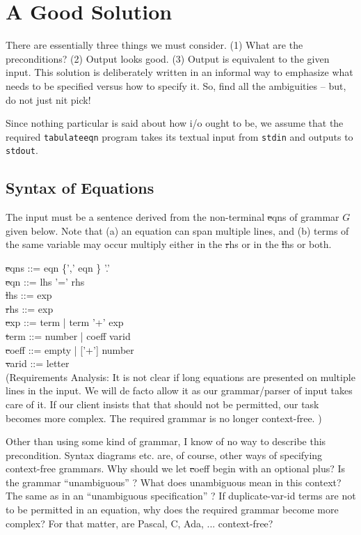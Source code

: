 \documentclass[12pt]{article}
\def\bnf{\st}
\begin{document}
\section{A Good Solution}

{\small There are essentially three things we must consider. (1) What
are the preconditions? (2) Output looks good.  (3) Output is
equivalent to the given input.  This solution is deliberately written
in an informal way to emphasize what needs to be specified versus how
to specify it.  So, find all the ambiguities -- but, do not just nit
pick! }

Since nothing particular is said about how i/o ought to be, we assume
that the required {\tt tabulateeqn} program takes its textual input
from {\tt stdin} and outputs to {\tt stdout}.


\subsection{Syntax of Equations}

The input must be a sentence derived from the non-terminal {\bnf eqns}
of grammar $G$ given below.  Note that (a) an equation can span
multiple lines, and (b) terms of the same variable may occur multiply
either in the {\bnf rhs} or in the {\bnf lhs} or both.

\noindent
{\bnf eqns ::= eqn \{',' eqn \} '.'}\\
{\bnf eqn ::= lhs '=' rhs}\\
{\bnf lhs ::= exp}\\
{\bnf rhs ::= exp}\\
{\bnf exp ::= term | term '+' exp}\\
{\bnf term ::= number | coeff varid}\\
{\bnf coeff ::= empty | ['+'] number}\\
{\bnf varid ::= letter}\\

(Requirements Analysis: It is not clear if long equations are
presented on multiple lines in the input.  We will de facto allow it
as our grammar/parser of input takes care of it.
If our client insists that that should not be permitted, our
task becomes more complex.  The required grammar is no longer
context-free. )

{\small Other than using some kind of grammar, I know of no way to
describe this precondition.  Syntax diagrams etc. are, of course,
other ways of specifying context-free grammars.  Why should we let
{\bnf coeff} begin with an optional plus?  Is the grammar
``unambiguous'' ?  What does unambiguous mean in this context?  The
same as in an ``unambiguous specification'' ?  If duplicate-var-id
terms are not to be permitted in an equation, why does the required
grammar become more complex?  For that matter, are Pascal, C, Ada,
... context-free?  }
\end{document}
